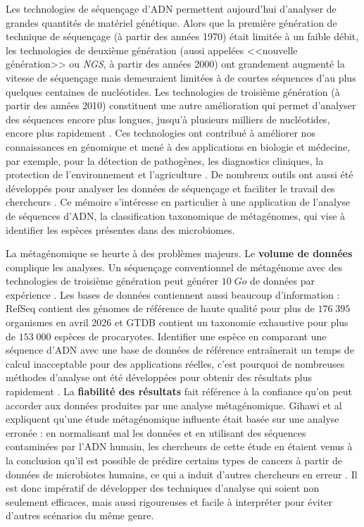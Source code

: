\begin{introduction}
\label{chapitre:introduction}

Les technologies de séquençage d'ADN permettent aujourd'hui d'analyser de grandes quantités de
matériel génétique. Alors que la première génération de technique de séquençage (à partir des années
1970) était limitée à un faible débit, les technologies de deuxième génération (aussi appelées
<<nouvelle génération>> ou \textit{NGS}, à partir des années 2000) ont grandement augmenté la
vitesse de séquençage mais demeuraient limitées à de courtes séquences d'au plus quelques centaines
de nucléotides. Les technologies de troisième génération (à partir des années 2010) constituent une
autre amélioration qui permet d'analyser des séquences encore plus longues, jusqu'à plusieurs
milliers de nucléotides, encore plus rapidement \cite{satam2023}. Ces technologies ont contribué à
améliorer nos connaissances en génomique et mené à des applications en biologie et médecine, par
exemple, pour la détection de pathogènes, les diagnostics cliniques, la protection de
l'environnement et l'agriculture \cite{liu2025}. De nombreux outils ont aussi été développés pour
analyser les données de séquençage et faciliter le travail des chercheurs \cite{roy2024}. Ce mémoire
s'intéresse en particulier à une application de l'analyse de séquences d'ADN, la classification
taxonomique de métagénomes, qui vise à identifier les espèces présentes dans des microbiomes.

La métagénomique se heurte à des problèmes majeurs. Le \textbf{volume de données} complique les
analyses. Un séquençage conventionnel de métagénome avec des technologies de troisième génération
peut générer $10\;Go$ de données par expérience \cite{PerezCobas2020}. Les bases de données
contiennent aussi beaucoup d'information : RefSeq \cite{refseq} contient des génomes de référence de
haute qualité pour plus de $176\;395$ organismes en avril 2026 et GTDB \cite{gtdb} contient un
taxonomie exhaustive pour plus de $153\;000$ espèces de procaryotes. Identifier une espèce en
comparant une séquence d'ADN avec une base de données de référence entraînerait un temps de calcul
inacceptable pour des applications réelles, c'est pourquoi de nombreuses méthodes d'analyse ont été
développées pour obtenir des résultats plus rapidement \cite{roy2024}. La \textbf{fiabilité des
résultats} fait référence à la confiance qu'on peut accorder aux données produites par une analyse
métagénomique. Gihawi et al expliquent qu'une étude métagénomique influente était basée sur une
analyse erronée : en normalisant mal les données et en utilisant des séquences contaminées par l'ADN
humain, les chercheurs de cette étude en étaient venus à la conclusion qu'il est possible de prédire
certains types de cancers à partir de données de microbiotes humains, ce qui a induit d'autres
chercheurs en erreur \cite{gihawi2023}. Il est donc impératif de développer des techniques d'analyse
qui soient non seulement efficaces, mais aussi rigoureuses et facile à interpréter pour éviter
d'autres scénarios du même genre.


\end{introduction}
